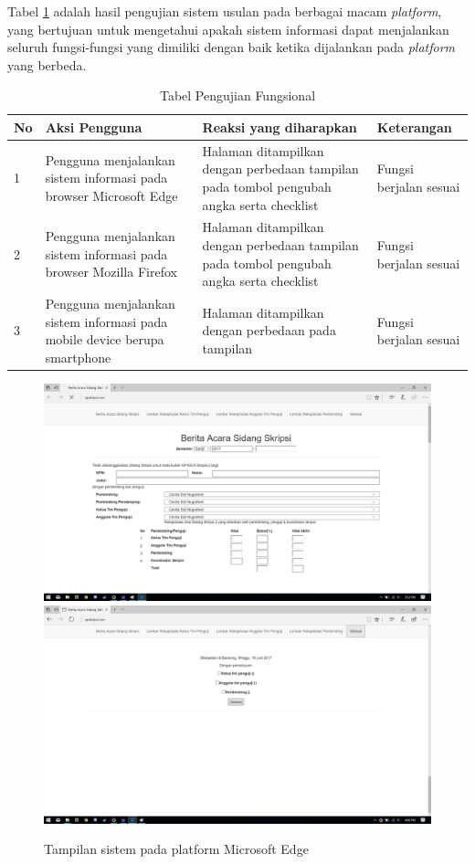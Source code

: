		Tabel \ref{pengFung} adalah hasil pengujian sistem usulan pada berbagai macam \textit{platform}, yang bertujuan untuk mengetahui apakah sistem informasi dapat menjalankan seluruh fungsi-fungsi yang dimiliki dengan baik ketika dijalankan pada \textit{platform} yang berbeda.
		
	\begin{table}[H]
		\centering
		\caption{Tabel Pengujian Fungsional}
		\label{pengFung}
		\begin{tabular}{| m{0.75cm} | m{7cm} | m{5cm} | m{3cm} |}
			\hline
			No & Aksi Pengguna & Reaksi yang diharapkan & Keterangan \\
			\hline
			1 & Pengguna menjalankan sistem informasi pada browser Microsoft Edge & Halaman ditampilkan dengan perbedaan tampilan pada tombol pengubah angka serta checklist & Fungsi berjalan sesuai \\
			\hline
			2 & Pengguna menjalankan sistem informasi pada browser Mozilla Firefox & Halaman ditampilkan dengan perbedaan tampilan pada tombol pengubah angka serta checklist & Fungsi berjalan sesuai \\
			\hline
			3 & Pengguna menjalankan sistem informasi pada mobile device berupa smartphone & Halaman ditampilkan dengan perbedaan pada tampilan & Fungsi berjalan sesuai \\
			\hline
		\end{tabular}
	\end{table}

\begin{figure}[H]
	\centering
	\includegraphics[scale=0.3]{Gambar/MsEdge}
	\includegraphics[scale=0.3]{Gambar/MsEdgeSelesai}
	\caption{Tampilan sistem pada platform Microsoft Edge}
	\label{fig:MsEdge}
\end{figure}

